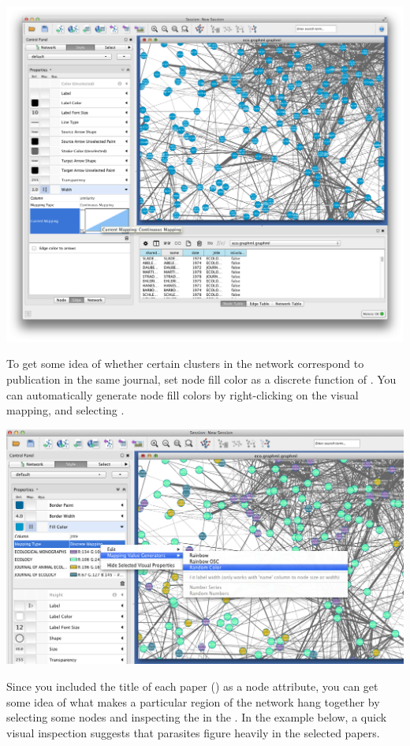 \documentclass[letterpaper,10pt,english]{sphinxmanual}
\begin{document}
{\hfill\includegraphics{cyto.2.png}\hfill}

To get some idea of whether certain clusters in the network correspond to publication
in the same journal, set node fill color as a discrete function of . You can
automatically generate node fill colors by right-clicking on the visual mapping, and
selecting .

{\hfill\includegraphics{cyto.3.png}\hfill}

Since you included the title of each paper () as a node attribute, you can
get some idea of what makes a particular region of the network hang together by selecting
some nodes and inspecting the  in the . In the example below,
a quick visual inspection suggests that parasites figure heavily in the selected papers.
\end{document}
